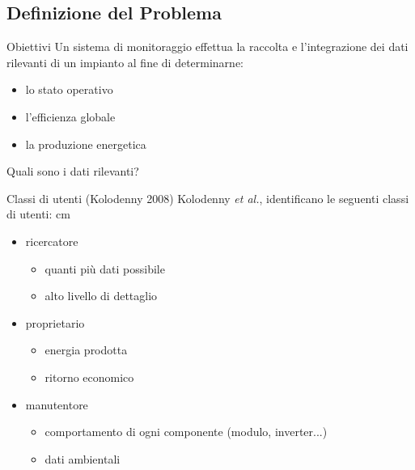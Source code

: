 \documentclass{beamer}
\newcommand{\N}{\vskip 0.3 cm}
\newcommand{\red}[1]{\textcolor[rgb]{.8,0,0}{#1}}
\newcommand{\green}[1]{\textcolor[rgb]{0,.6,.1}{#1}}
\begin{document}
\subsection{Definizione del Problema}
\begin{frame}{Obiettivi}
Un sistema di monitoraggio effettua la \green{raccolta} e \green{l'integrazione} dei  \red{dati rilevanti} di un impianto al fine di
determinarne:
%
\begin{itemize}
\item lo stato operativo
\item l'efficienza globale
\item la produzione energetica
\end{itemize}
%
\begin{figure}[!h]
  \begin{center}
  \end{center}
\end{figure}
%
Quali sono i \red{dati rilevanti}?
\end{frame}
%

%
\begin{frame}{Classi di utenti (Kolodenny 2008)}
Kolodenny \emph{et al.}, identificano le seguenti \green{classi di utenti}:
\N
%
\begin{itemize}
\item \red{ricercatore}
  \begin{itemize}
  \item quanti pi\`u dati possibile
  \item alto livello di dettaglio
  \end{itemize}
\item \red{proprietario}
  \begin{itemize}
  \item energia prodotta
  \item ritorno economico
  \end{itemize}
\item \red{manutentore}
  \begin{itemize}
  \item comportamento di ogni componente (modulo, inverter...)
  \item dati ambientali
  \end{itemize}
\end{itemize}
%
\end{frame}
%
\end{document}
